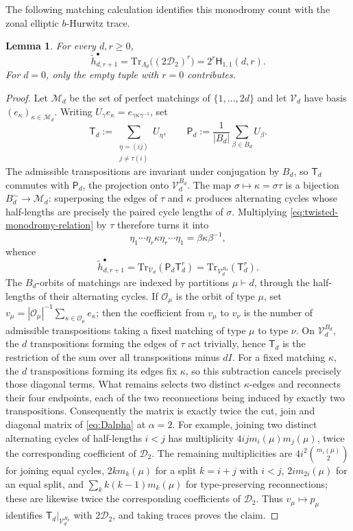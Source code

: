 \documentclass[11pt,a4paper,reqno]{article}
\newtheorem{lemma}[theorem]{Lemma}
\theoremstyle{definition}
\theoremstyle{remark}
\newcommand\Tr{{\mathrm{Tr}}}
\newcommand\Hb{{\mathsf H}}
\newcommand\Dcal{{\mathcal D}}
\begin{document}
The following matching calculation identifies this monodromy count with the zonal elliptic $b$-Hurwitz trace.

\begin{lemma}\label{lem:twisted-matching-trace}
For every $d,r\geq0$,
\begin{equation}\label{eq:twisted-matching-trace}
\widetilde h_{d,r+1}^{\bullet} =\Tr_{\Lambda_d}\bigl((2\Dcal_2)^r\bigr) =2^r\Hb_{1,1}(d,r).
\end{equation}
For $d=0$, only the empty tuple with $r=0$ contributes.
\end{lemma}

\begin{proof}
Let $\mathcal M_d$ be the set of perfect matchings of $\{1,\ldots,2d\}$ and let $\mathscr V_d$ have basis $(e_\kappa)_{\kappa\in\mathcal M_d}$.  Writing $U_\gamma e_\kappa=e_{\gamma\kappa\gamma^{-1}}$, set
\[
\mathsf T_d:=\sum_{\substack{\eta=(ij)\\j\ne\tau(i)}}U_\eta,
\qquad
\mathsf P_d:=\frac1{|B_d|}\sum_{\beta\in B_d}U_\beta.
\]
The admissible transpositions are invariant under conjugation by $B_d$, so $\mathsf T_d$ commutes with $\mathsf P_d$, the projection onto $\mathscr V_d^{B_d}$.  The map $\sigma\mapsto\kappa=\sigma\tau$ is a bijection $B_d^{\sim}\to\mathcal M_d$: superposing the edges of $\tau$ and $\kappa$ produces alternating cycles whose half-lengths are precisely the paired cycle lengths of $\sigma$.  Multiplying \eqref{eq:twisted-monodromy-relation} by $\tau$ therefore turns it into
\[
\eta_1\cdots\eta_r\kappa\eta_r\cdots\eta_1 =\beta\kappa\beta^{-1},
\]
whence
\[
\widetilde h_{d,r+1}^{\bullet} =\Tr_{\mathscr V_d}(\mathsf P_d\mathsf T_d^r) =\Tr_{\mathscr V_d^{B_d}}(\mathsf T_d^r).
\]
The $B_d$-orbits of matchings are indexed by partitions $\mu\vdash d$, through the half-lengths of their alternating cycles.  If $\mathcal O_\mu$ is the orbit of type $\mu$, set $v_\mu=|\mathcal O_\mu|^{-1}\sum_{\kappa\in\mathcal O_\mu}e_\kappa$; then the coefficient from $v_\mu$ to $v_\nu$ is the number of admissible transpositions taking a fixed matching of type $\mu$ to type $\nu$.  On $\mathscr V_d^{B_d}$, the $d$ transpositions forming the edges of $\tau$ act trivially, hence $\mathsf T_d$ is the restriction of the sum over all transpositions minus $dI$.  For a fixed matching $\kappa$, the $d$ transpositions forming its edges fix $\kappa$, so this subtraction cancels precisely those diagonal terms.  What remains selects two distinct $\kappa$-edges and reconnects their four endpoints, each of the two reconnections being induced by exactly two transpositions.  Consequently the matrix is exactly twice the cut, join and diagonal matrix of \eqref{eq:Dalpha} at $\alpha=2$.  For example, joining two distinct alternating cycles of half-lengths $i<j$ has multiplicity $4ijm_i(\mu)m_j(\mu)$, twice the corresponding coefficient of $\Dcal_2$.  The remaining multiplicities are $4i^2\binom{m_i(\mu)}{2}$ for joining equal cycles, $2km_k(\mu)$ for a split $k=i+j$ with $i<j$, $2im_{2i}(\mu)$ for an equal split, and $\sum_k k(k-1)m_k(\mu)$ for type-preserving reconnections; these are likewise twice the corresponding coefficients of $\Dcal_2$.  Thus $v_\mu\mapsto p_\mu$ identifies $\mathsf T_d|_{\mathscr V_d^{B_d}}$ with $2\Dcal_2$, and taking traces proves the claim.

\end{proof}
\end{document}

